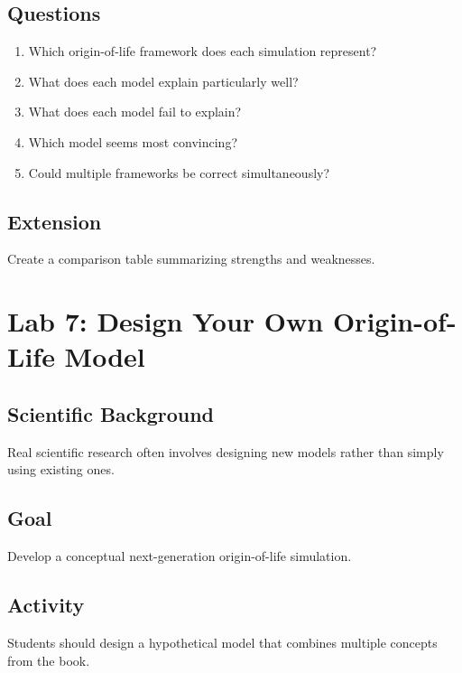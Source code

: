 \documentclass[
  oneside,
  openany]{book}
\providecommand{\tightlist}{%
  \setlength{\itemsep}{0pt}\setlength{\parskip}{0pt}}
\begin{document}
\subsection{Questions}\label{questions-5}

\begin{enumerate}
\def\labelenumi{\arabic{enumi}.}
\tightlist
\item
  Which origin-of-life framework does each simulation represent?
\item
  What does each model explain particularly well?
\item
  What does each model fail to explain?
\item
  Which model seems most convincing?
\item
  Could multiple frameworks be correct simultaneously?
\end{enumerate}

\subsection{Extension}\label{extension-5}

Create a comparison table summarizing strengths and weaknesses.

\section{Lab 7: Design Your Own Origin-of-Life Model}\label{lab-7-design-your-own-origin-of-life-model}

\subsection{Scientific Background}\label{scientific-background-6}

Real scientific research often involves designing new models rather than simply using existing ones.

\subsection{Goal}\label{goal-6}

Develop a conceptual next-generation origin-of-life simulation.

\subsection{Activity}\label{activity-6}

Students should design a hypothetical model that combines multiple concepts from the book.
\end{document}
